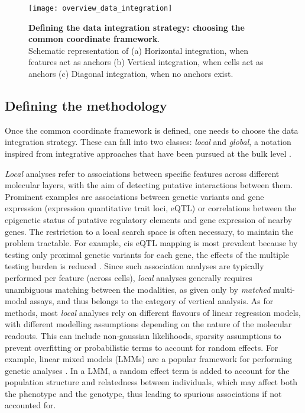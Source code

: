 \begin{figure}[H]
	\centering
	\texttt{[image: overview\_data\_integration]}
	\caption{\textbf{Defining the data integration strategy: choosing the common coordinate framework}.\\Schematic representation of (a) Horizontal integration, when features act as anchors (b) Vertical integration, when cells act as anchors (c) Diagonal integration, when no anchors exist. }
	\label{fig:overview_data_integration}
\end{figure}

\subsection{Defining the methodology}

Once the common coordinate framework is defined, one needs to choose the data integration strategy. These can fall into two classes: \textit{local} and \textit{global}, a notation inspired from integrative approaches that have been pursued at the bulk level \cite{Ritchie2015}. 

\textit{Local} analyses refer to associations between specific features across different molecular layers, with the aim of detecting putative interactions between them. Prominent examples are associations between genetic variants and gene expression (expression quantitative trait loci, eQTL) or correlations between the epigenetic status of putative regulatory elements and gene expression of nearby genes. The restriction to a local search space is often necessary, to maintain the problem tractable. For example, cis eQTL mapping is most prevalent because by testing only proximal genetic variants for each gene, the effects of the multiple testing burden is reduced \cite{Nica2013}. Since such association analyses are typically performed per feature (across cells), \textit{local} analyses generally requires unambiguous matching between the modalities, as given only by \textit{matched} multi-modal assays, and thus belongs to the category of vertical analysis. As for methods, most \textit{local} analyses rely on different flavours of linear regression models, with different modelling assumptions depending on the nature of the molecular readouts. This can include non-gaussian likelihoods, sparsity assumptions to prevent overfitting or probabilistic terms to account for random effects. For example, linear mixed models (LMMs) are a popular framework for performing genetic analyses \cite{Moore2019}. In a LMM, a random effect term is added to account for the population structure and relatedness between individuals, which may affect both the phenotype and the genotype, thus leading to spurious associations if not accounted for.

